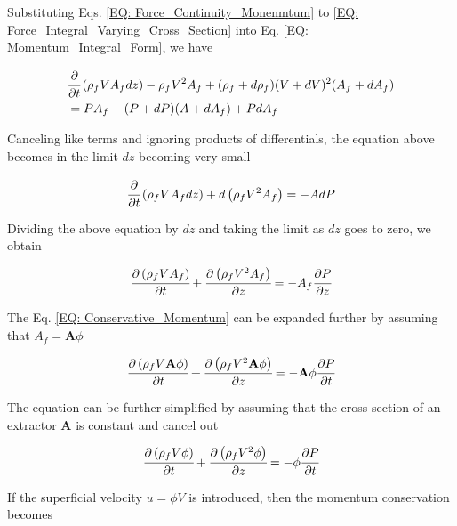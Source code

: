 \documentclass[../Article_Model_Parameters.tex]{subfiles}
\begin{document}
	Substituting Eqs. \ref{EQ: Force_Continuity_Monenmtum} to \ref{EQ: Force_Integral_Varying_Cross_Section} into Eq. \ref{EQ: Momentum_Integral_Form}, we have
	
	{\footnotesize
		\begin{align}
			& \cfrac{\partial}{\partial t} \left( \rho_f V A_f dz \right) - \rho_f V^2 A_f + (\rho_f + d\rho_f)(V+dV)^2(A_f+dA_f)  \nonumber \\
			&= PA_f - (P+dP)(A+dA_f)+PdA_f
		\end{align}
	}
	
	Canceling like terms and ignoring products of differentials, the equation above becomes in the limit $dz$ becoming  very small
	
	{\footnotesize
		\begin{equation}
			\cfrac{\partial}{\partial t} \left( \rho_f V A_f dz \right) + d\left( \rho_f V^2 A_f \right) = -A dP
		\end{equation}
	}

	Dividing the above equation by $dz$ and taking the limit as $dz$ goes to zero, we obtain
	
	{\footnotesize
		\begin{equation}
			\cfrac{\partial \left( \rho_f V A_f \right)}{\partial t} + \cfrac{\partial \left( \rho_f V^2 A_f \right)}{\partial z} = -A_f \cfrac{\partial P}{\partial z}
			\label{EQ: Conservative_Momentum}
		\end{equation}
	}

	The Eq. \ref{EQ: Conservative_Momentum} can be expanded further by assuming that $A_f = \textbf{A}\phi$ 
	
	{\footnotesize
		\begin{equation}
			\cfrac{\partial \left( \rho_f V \textbf{A} \phi \right) }{\partial t} + \cfrac{\partial \left( \rho_f V^2 \textbf{A} \phi \right) }{\partial z} = - 	\textbf{A} \phi \cfrac{\partial P}{\partial t}
		\end{equation}
	}

	The equation can be further simplified by assuming that the cross-section of an extractor $\textbf{A}$ is constant and cancel out
	
	{\footnotesize
		\begin{equation}
			\cfrac{\partial \left( \rho_f V \phi \right) }{\partial t} + \cfrac{\partial \left( \rho_f V^2 \phi \right) }{\partial z} = - \phi 	\cfrac{\partial P}{\partial t}
		\end{equation}
	}

	If the superficial velocity $u=\phi V$ is introduced, then the momentum conservation becomes
	
\end{document}
